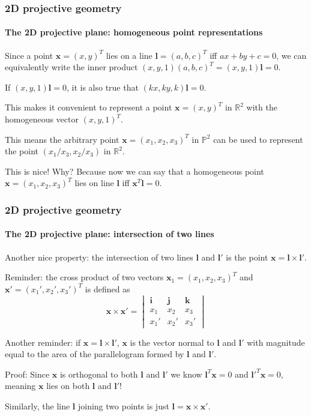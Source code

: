 \documentclass[aspectratio=169]{beamer}
\renewcommand{\vec}[1]{\boldsymbol{#1}}
\def\Rset{\mathbb{R}}
\def\Pset{\mathbb{P}}
\begin{document}
\begin{frame}
\frametitle{2D projective geometry}
\framesubtitle{The 2D projective plane: homogeneous point representations}

Since a point $\vec{x}=(x,y)^T$ lies on a line $\vec{l}=(a,b,c)^T$ iff
$ax+by+c=0$, we can equivalently write the inner product
$(x,y,1)(a,b,c)^T=(x,y,1)\vec{l}=0$.

\medskip

If $(x,y,1)\vec{l}=0$, it is also true that $(kx,ky,k)\vec{l}=0$.

\medskip

This makes it convenient to represent a point $\vec{x}=(x,y)^T$ in
$\Rset^2$ with the \alert{homogeneous vector} $(x,y,1)^T$.

\medskip

This means the arbitrary point $\vec{x}=(x_1,x_2,x_3)^T$ in $\Pset^2$
can be used to represent the point $(x_1/x_3,x_2/x_3)$ in $\Rset^2$.

\medskip

This is nice!  Why?  Because now we can say that a homogeneous point
$\vec{x} = (x_1,x_2,x_3)^T$ lies on line $\vec{l}$ iff
$\vec{x}^T\vec{l}=0$.

\end{frame}

\begin{frame}
\frametitle{2D projective geometry}
\framesubtitle{The 2D projective plane: intersection of two lines}

Another nice property: the \alert{intersection of two lines}
$\vec{l}$ and $\vec{l}'$ is the point $\vec{x}=\vec{l}\times\vec{l}'$.

\medskip

Reminder: the cross product of two vectors $\vec{x}_1 = (x_1,x_2,x_3)^T$ and
$\vec{x}' = (x_1',x_2',x_3')^T$ is defined as
\begin{equation*}
\vec{x}\times\vec{x}' =
\begin{vmatrix}
\vec{i} & \vec{j} & \vec{k} \\
x_1 & x_2 & x_3 \\
x_1' & x_2' & x_3'
\end{vmatrix}
\end{equation*}

\medskip

Another reminder: if $\vec{x} = \vec{l} \times \vec{l}'$, $\vec{x}$ is
the vector normal to $\vec{l}$ and $\vec{l}'$ with magnitude equal to
the area of the parallelogram formed by $\vec{l}$ and $\vec{l}'$.

\medskip

Proof: Since $\vec{x}$ is orthogonal to both $\vec{l}$ and $\vec{l}'$
we know $\vec{l}^T\vec{x}=0$ and $\vec{l}'^T\vec{x}=0$, meaning
$\vec{x}$ lies on both $\vec{l}$ and $\vec{l}'$!

\medskip

Similarly, the line $\vec{l}$ joining two points is just
$\vec{l}=\vec{x}\times\vec{x}'$.

\end{frame}
\end{document}
